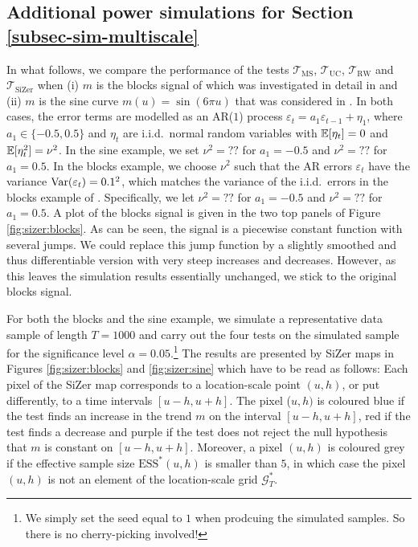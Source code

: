 \subsection*{Additional power simulations for Section \ref{subsec-sim-multiscale}}


In what follows, we compare the performance of the tests $\mathcal{T}_{\text{MS}}$, $\mathcal{T}_{\text{UC}}$, $\mathcal{T}_{\text{RW}}$ and $\mathcal{T}_{\text{SiZer}}$ when (i) $m$ is the blocks signal of \cite{DonohoJohnstone1995} which was investigated in detail in \cite{HannigMarron2006} and (ii) $m$ is the sine curve $m(u) = \sin(6\pi u)$ that was considered in \cite{ParkHannigKang2009}. In both cases, the error terms are modelled as an AR($1$) process $\varepsilon_t = a_1 \varepsilon_{t-1} + \eta_1$, where $a_1 \in\{-0.5,0.5\}$ and $\eta_t$ are i.i.d.\ normal random variables with $\mathbb{E}[\eta_t] = 0$ and $\mathbb{E}[\eta_t^2] = \nu^2$. In the sine example, we set $\nu^2 = ??$ for $a_1 = -0.5$ and $\nu^2 = ??$ for $a_1 = 0.5$. In the blocks example, we choose $\nu^2$ such that the AR errors $\varepsilon_t$ have the variance $\textnormal{Var}(\varepsilon_t) = 0.1^2$, which matches the variance of the i.i.d.\ errors in the blocks example of \cite{HannigMarron2006}.
Specifically, we let $\nu^2 = ??$ for $a_1 =-0.5$ and $\nu^2 = ??$ for $a_1 = 0.5$. A plot of the blocks signal is given in the two top panels of Figure \ref{fig:sizer:blocks}. As can be seen, the signal is a piecewise constant function with several jumps. We could replace this jump function by a slightly smoothed and thus differentiable version with very steep increases and decreases. However, as this leaves the simulation results essentially unchanged, we stick to the original blocks signal.  


For both the blocks and the sine example, we simulate a representative data sample of length $T=1000$ and carry out the four tests on the simulated sample for the significance level $\alpha=0.05$.\footnote{We simply set the seed equal to $1$ when prodcuing the simulated samples. So there is no cherry-picking involved!} The results are presented by SiZer maps in Figures \ref{fig:sizer:blocks} and \ref{fig:sizer:sine} which have to be read as follows: Each pixel of the SiZer map corresponds to a location-scale point $(u,h)$, or put differently, to a time intervals $[u-h,u+h]$. The pixel ($u,h)$ is coloured blue if the test finds an increase in the trend $m$ on the interval $[u-h,u+h]$, red if the test finds a decrease and purple if the test does not reject the null hypothesis that $m$ is constant on $[u-h,u+h]$. Moreover, a pixel $(u,h)$ is coloured grey if the effective sample size $\text{ESS}^*(u,h)$ is smaller than $5$, in which case the pixel $(u,h)$ is not an element of the location-scale grid $\mathcal{G}_T^*$.


